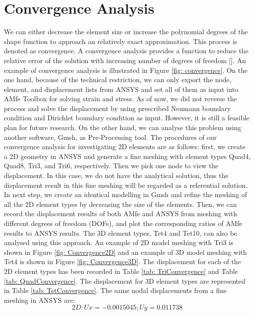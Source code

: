 \section{Convergence Analysis}
We can either decrease the element size or increase the polynomial degrees of the shape function to approach an relatively exact approximation. This process is denoted as convergence. A convergence analysis provides a function to reduce the relative error of the solution with increasing number of degrees of freedom [\cite{FiniteElement}]. An example of convergence analysis is illustrated in Figure \ref{fig: convergence}. On the one hand, because of the technical restriction, we can only export the node, element, and displacement lists from ANSYS and set all of them as input into AMfe Toolbox for solving strain and stress. As of now, we did not reverse the process and solve the displacement by using prescribed Neumann boundary condition and Dirichlet boundary condition as input. However, it is still a feasible plan for future research. On the other hand, we can analyse this problem using another software, Gmsh, as Pre-Processing tool. The procedures of our convergence analysis for investigating 2D elements are as follows: first, we create a 2D geometry in ANSYS and generate a fine meshing with element types Quad4, Quad8, Tri3, and Tri6, respectively. Then we pick one node to view the displacement. In this case, we do not have the analytical solution, thus the displacement result in this fine meshing will be regarded as a referential solution. In next step, we create an identical modelling in Gmsh and refine the meshing of all the 2D element types by decreasing the size of the elements. Then, we can record the displacement results of both AMfe and ANSYS from meshing with different degrees of freedom (DOFs), and plot the corresponding ratios of AMfe results to ANSYS results. The 3D element types, Tet4 and Tet10, can also be analysed using this approach. An example of 2D model meshing with Tri3 is shown in Figure \ref{fig: Convergence2D} and an example of 3D model meshing with Tet4 is shown in Figure \ref{fig: Convergence3D}.
The displacement for each of the 2D element types has been recorded in Table \ref{tab: TriConvergence} and Table \ref{tab: QuadConvergence}. The displacement for 3D element types are represented in Table \ref{tab: TetConvergence}. The same nodal displacements from a fine meshing in ANSYS are:
\begin{equation*}
2D: Ux = -0.0015045; Uy = 0.011738
\end{equation*}

